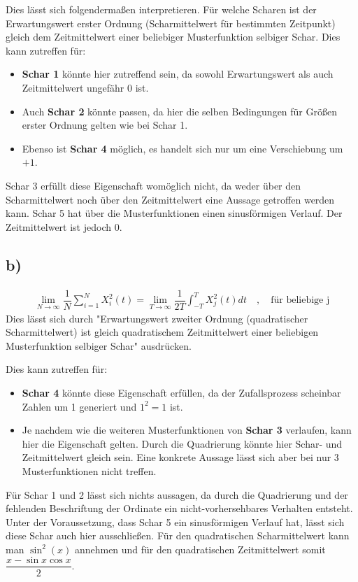 \documentclass[11pt]{scrartcl} %
\begin{document}
Dies lässt sich folgendermaßen interpretieren. Für welche Scharen ist der Erwartungswert erster Ordnung (Scharmittelwert für bestimmten Zeitpunkt) gleich dem Zeitmittelwert einer beliebiger Musterfunktion selbiger Schar.
Dies kann zutreffen für:
\begin{itemize}
\item \textbf{Schar 1} könnte hier zutreffend sein, da sowohl Erwartungswert als auch Zeitmittelwert ungefähr 0 ist.
\item Auch \textbf{Schar 2} könnte passen, da hier die selben Bedingungen für Größen erster Ordnung gelten wie bei Schar 1.
\item Ebenso ist \textbf{Schar 4} möglich, es handelt sich nur um eine Verschiebung um $+1$. 
\end{itemize}
Schar 3 erfüllt diese Eigenschaft womöglich nicht, da weder über den Scharmittelwert noch über den Zeitmittelwert eine Aussage getroffen werden kann. Schar 5 hat über die Musterfunktionen einen sinusförmigen Verlauf. Der Zeitmittelwert ist jedoch 0.

\subsection*{b)}
\begin{align*}
\lim_{N \rightarrow \infty} \dfrac{1}{N} \sum_{i=1}^N X_i^2\left(t\right) = \lim_{T \rightarrow \infty} \dfrac{1}{2T} \int_{-T}^T X_j^2\left(t\right)dt \quad , \quad \text{für beliebige j}
\end{align*}
Dies lässt sich durch "Erwartungswert zweiter Ordnung (quadratischer Scharmittelwert) ist gleich quadratischem Zeitmittelwert einer beliebigen Musterfunktion selbiger Schar" ausdrücken.

Dies kann zutreffen für:
\begin{itemize}
\item \textbf{Schar 4} könnte diese Eigenschaft erfüllen, da der Zufallsprozess scheinbar Zahlen um 1 generiert und $1^2=1$ ist.
\item Je nachdem wie die weiteren Musterfunktionen von \textbf{Schar 3} verlaufen, kann hier die Eigenschaft gelten. Durch die Quadrierung könnte hier Schar- und Zeitmittelwert gleich sein. Eine konkrete Aussage lässt sich aber bei nur 3 Musterfunktionen nicht treffen.
\end{itemize}
Für Schar 1 und 2 lässt sich nichts aussagen, da durch die Quadrierung und der fehlenden Beschriftung der Ordinate ein nicht-vorhersehbares Verhalten entsteht. Unter der Voraussetzung, dass Schar 5 ein sinusförmigen Verlauf hat, lässt sich diese Schar auch hier ausschließen. Für den quadratischen Scharmittelwert kann man $\sin^2(x)$ annehmen und für den quadratischen Zeitmittelwert somit $\dfrac{x - \sin x \cos x}{2}$.
\end{document}
